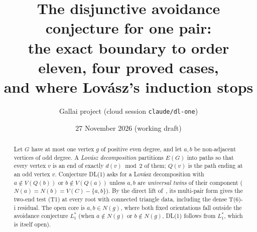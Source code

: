 \documentclass[11pt]{amsart}
\title[DL for one pair]{The disjunctive avoidance conjecture for one pair:\\
the exact boundary to order eleven, four proved cases,\\ and where Lov\'asz's induction stops}
\author{Gallai project (cloud session \texttt{claude/dl-one})}
\date{27 November 2026 (working draft)}
\theoremstyle{definition}
\begin{document}
\begin{abstract}
Let $G$ have at most one vertex $g$ of positive even degree, and let $a,b$ be non-adjacent vertices
of odd degree. A \emph{Lov\'asz decomposition} partitions $E(G)$ into paths so that every vertex
$v$ is an end of exactly $d(v)\bmod 2$ of them; $Q(v)$ is the path ending at an odd vertex $v$.
Conjecture DL(1) asks for a Lov\'asz decomposition with $a\notin V(Q(b))$ or $b\notin V(Q(a))$
unless $a,b$ are \emph{universal twins} of their component ($N(a)=N(b)=V(C)-\{a,b\}$). By the
direct lift of~\cite{DT}, its multi-pair form gives the two-end test (T1) at every root with
connected triangle data, including the dense T(6)-i residual. The open core is $a,b\in N(g)$,
where both fixed orientations fall outside the avoidance conjecture $L_1^*$ (when $a\notin N(g)$ or
$b\notin N(g)$, DL(1) follows from $L_1^*$, which is itself open).


\end{abstract}
\end{document}

